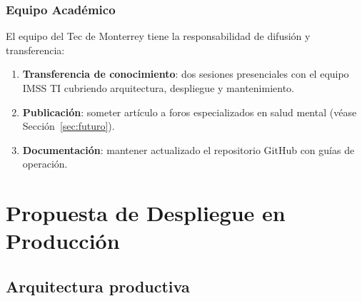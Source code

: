 \documentclass[12pt, letterpaper]{article}
\newcommand{\secref}[1]{Sección~\ref{#1}}
\begin{document}
\subsubsection{Equipo Académico}

El equipo del Tec de Monterrey tiene la responsabilidad de difusión y transferencia:

\begin{enumerate}[noitemsep]
    \item \textbf{Transferencia de conocimiento}: dos sesiones presenciales con el equipo IMSS TI cubriendo arquitectura, despliegue y mantenimiento.
    \item \textbf{Publicación}: someter artículo a foros especializados en salud mental (véase \secref{sec:futuro}).
    \item \textbf{Documentación}: mantener actualizado el repositorio GitHub con guías de operación.
\end{enumerate}

\newpage

\section{Propuesta de Despliegue en Producción}\label{sec:despliegue}

\subsection{Arquitectura productiva}
\end{document}
